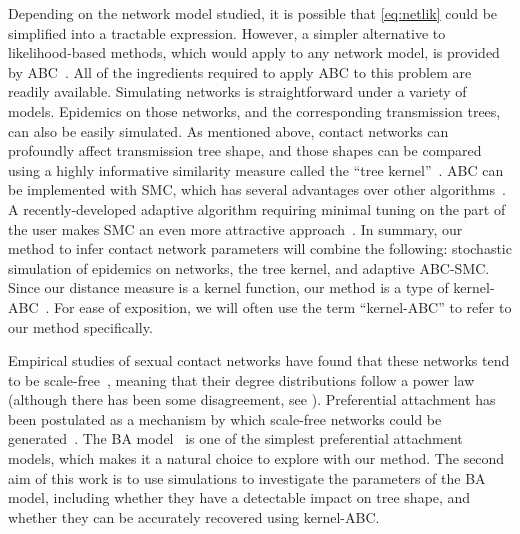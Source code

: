 Depending on the network model studied, it is possible that \cref{eq:netlik}
could be simplified into a tractable expression. However, a simpler alternative
to likelihood-based methods, which would apply to any network model, is
provided by
\gls{ABC}~\autocite{rubin1984bayesianly,tavare1997inferring,fu1997estimating,beaumont2002approximate}.
All of the ingredients required to apply \gls{ABC} to this problem are readily
available. Simulating networks is straightforward under a variety of models.
Epidemics on those networks, and the corresponding transmission trees, can also
be easily simulated. As mentioned above, contact networks can profoundly affect
transmission tree shape, and those shapes can be compared using a highly
informative similarity measure called the ``tree
kernel''~\autocite{poon2013mapping}. \Gls{ABC} can be implemented with
\gls{SMC}, which has several advantages over other
algorithms~\autocite{mckinley2009inference}. A recently-developed adaptive
algorithm requiring minimal tuning on the part of the user makes \gls{SMC} an
even more attractive approach~\autocite{del2012adaptive}. In summary, our
method to infer contact network parameters will combine the following:
stochastic simulation of epidemics on networks, the tree kernel, and adaptive
\gls{ABC}-\gls{SMC}. Since our distance measure is a kernel function, our
method is a type of kernel-\gls{ABC}~\autocite{nakagome2013kernel}. For ease of
exposition, we will often use the term ``kernel-\gls{ABC}'' to refer to our
method specifically.

Empirical studies of sexual contact networks have found that these networks
tend to be scale-free~\autocite{colgate1989risk, liljeros2001web,
schneeberger2004scale,clemenccon2015statistical}, meaning that their degree
distributions follow a power law (although there has been some disagreement,
see \autocite{handcock2004likelihood, bansal2007individual}). Preferential
attachment has been postulated as a mechanism by which scale-free networks
could be generated~\autocite{barabasi1999emergence}. The \gls{BA}
model~\autocite{barabasi1999emergence} is one of the simplest preferential
attachment models, which makes it a natural choice to explore with our method.
The second aim of this work is to use simulations to investigate the parameters
of the \gls{BA} model, including whether they have a detectable impact on tree
shape, and whether they can be accurately recovered using kernel-\gls{ABC}.

